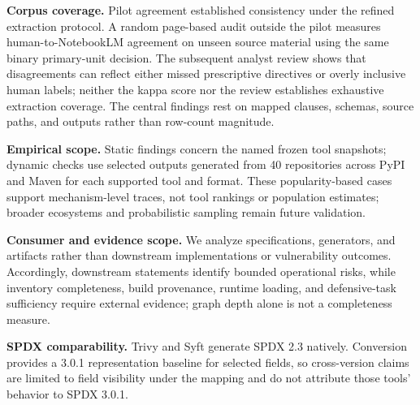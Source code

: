 \textbf{Corpus coverage.} Pilot agreement established consistency under the refined extraction protocol. A random page-based audit outside the pilot measures human-to-NotebookLM agreement on unseen source material using the same binary primary-unit decision. The subsequent analyst review shows that disagreements can reflect either missed prescriptive directives or overly inclusive human labels; neither the kappa score nor the review establishes exhaustive extraction coverage. The central findings rest on mapped clauses, schemas, source paths, and outputs rather than row-count magnitude.

\textbf{Empirical scope.} Static findings concern the named frozen tool snapshots; dynamic checks use selected outputs generated from 40 repositories across PyPI and Maven for each supported tool and format. These popularity-based cases support mechanism-level traces, not tool rankings or population estimates; broader ecosystems and probabilistic sampling remain future validation.

\textbf{Consumer and evidence scope.} We analyze specifications, generators, and artifacts rather than downstream implementations or vulnerability outcomes. Accordingly, downstream statements identify bounded operational risks, while inventory completeness, build provenance, runtime loading, and defensive-task sufficiency require external evidence; graph depth alone is not a completeness measure.

\textbf{SPDX comparability.} Trivy and Syft generate SPDX 2.3 natively. Conversion provides a 3.0.1 representation baseline for selected fields, so cross-version claims are limited to field visibility under the mapping and do not attribute those tools' behavior to SPDX 3.0.1.
